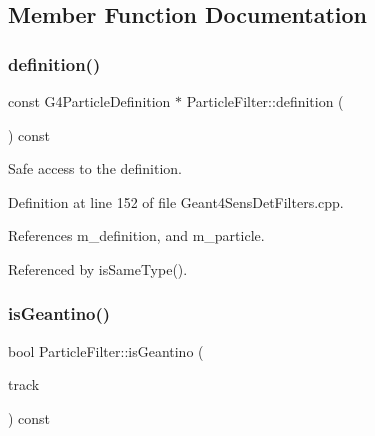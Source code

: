 \subsection{Member Function Documentation}
\hypertarget{struct_d_d4hep_1_1_simulation_1_1_particle_filter_a4f831e36facf6549347faafb0bb906f6}{}\label{struct_d_d4hep_1_1_simulation_1_1_particle_filter_a4f831e36facf6549347faafb0bb906f6} 
\subsubsection{\texorpdfstring{definition()}{definition()}}
{\footnotesize\ttfamily const G4\+Particle\+Definition $\ast$ Particle\+Filter\+::definition (\begin{DoxyParamCaption}{ }\end{DoxyParamCaption}) const}



Safe access to the definition. 



Definition at line 152 of file Geant4\+Sens\+Det\+Filters.\+cpp.



References m\+\_\+definition, and m\+\_\+particle.



Referenced by is\+Same\+Type().

\hypertarget{struct_d_d4hep_1_1_simulation_1_1_particle_filter_a5bf4dd25eb5f1000632fd5989f773676}{}\label{struct_d_d4hep_1_1_simulation_1_1_particle_filter_a5bf4dd25eb5f1000632fd5989f773676} 
\subsubsection{\texorpdfstring{is\+Geantino()}{isGeantino()}}
{\footnotesize\ttfamily bool Particle\+Filter\+::is\+Geantino (\begin{DoxyParamCaption}\item[{const G4\+Track $\ast$}]{track }\end{DoxyParamCaption}) const}



